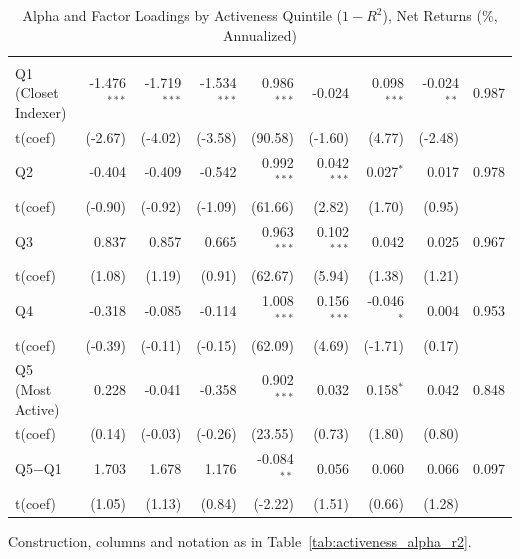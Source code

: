 \begin{table}[!htbp]
{\begin{tabular*}{\linewidth}{@{\extracolsep{\fill}}lrrrrrrrr}
\addlinespace[0.3em]
\hline
\multicolumn{9}{l}{Panel D: Active --- VW Net}\\
\hspace{1em}Q1 (Closet Indexer) & -1.476$^{***}$ & -1.719$^{***}$ & -1.534$^{***}$ & 0.986$^{***}$ & -0.024 & 0.098$^{***}$ & -0.024$^{**}$ & 0.987\\
\hspace{1em}t(coef) & (-2.67) & (-4.02) & (-3.58) & (90.58) & (-1.60) & (4.77) & (-2.48) & \\
\hspace{1em}Q2 & -0.404 & -0.409 & -0.542 & 0.992$^{***}$ & 0.042$^{***}$ & 0.027$^{*}$ & 0.017 & 0.978\\
\hspace{1em}t(coef) & (-0.90) & (-0.92) & (-1.09) & (61.66) & (2.82) & (1.70) & (0.95) & \\
\hspace{1em}Q3 & 0.837 & 0.857 & 0.665 & 0.963$^{***}$ & 0.102$^{***}$ & 0.042 & 0.025 & 0.967\\
\hspace{1em}t(coef) & (1.08) & (1.19) & (0.91) & (62.67) & (5.94) & (1.38) & (1.21) & \\
\hspace{1em}Q4 & -0.318 & -0.085 & -0.114 & 1.008$^{***}$ & 0.156$^{***}$ & -0.046$^{*}$ & 0.004 & 0.953\\
\hspace{1em}t(coef) & (-0.39) & (-0.11) & (-0.15) & (62.09) & (4.69) & (-1.71) & (0.17) & \\
\hspace{1em}Q5 (Most Active) & 0.228 & -0.041 & -0.358 & 0.902$^{***}$ & 0.032 & 0.158$^{*}$ & 0.042 & 0.848\\
\hspace{1em}t(coef) & (0.14) & (-0.03) & (-0.26) & (23.55) & (0.73) & (1.80) & (0.80) & \\
\hspace{1em}Q5$-$Q1 & 1.703 & 1.678 & 1.176 & -0.084$^{**}$ & 0.056 & 0.060 & 0.066 & 0.097\\
\hspace{1em}t(coef) & (1.05) & (1.13) & (0.84) & (-2.22) & (1.51) & (0.66) & (1.28) & \\
\bottomrule
\end{tabular*}%
}\sbefit
\fi
\setlength{\tabletempwidth}{\wd\tabletempbox}
\ifdim\tabletempwidth>\linewidth\setlength{\tabletempwidth}{\linewidth}\fi
\begin{minipage}{\tabletempwidth}
\captionsetup{width=\linewidth}
\caption{Alpha and Factor Loadings by Activeness Quintile ($1-R^2$), Net Returns (\%, Annualized)}\label{tab:activeness_alpha_r2_net}
\ifdim\wd\tabletempbox>\linewidth
  \resizebox{\linewidth}{!}{\usebox{\tabletempbox}}
\else
  \usebox{\tabletempbox}
\fi
\par\medskip
\begin{singlespace}\tablefont\noindent
Construction, columns and notation as in Table~\ref{tab:activeness_alpha_r2}.
\end{singlespace}
\end{minipage}
\end{table}

